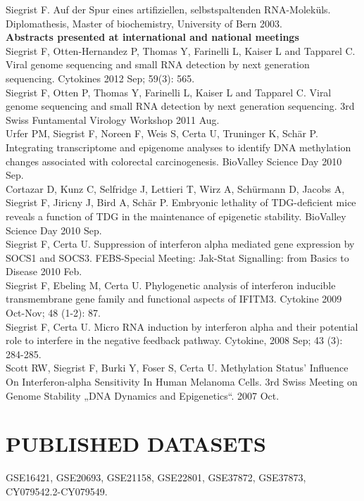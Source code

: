 \documentclass{res}
\begin{document}
\begin{resume}
Siegrist F. Auf der Spur eines artifiziellen, selbstspaltenden RNA-Moleküls. Diplomathesis, Master of biochemistry, University of Bern 2003. \\
   {\bf  Abstracts presented at international and national meetings}  \\
Siegrist F, Otten-Hernandez P, Thomas Y, Farinelli L, Kaiser L and Tapparel C. Viral genome sequencing and small RNA detection by next generation sequencing. Cytokines 2012 Sep; 59(3): 565. \\
Siegrist F, Otten P, Thomas Y, Farinelli L, Kaiser L and Tapparel C. Viral genome sequencing and small RNA detection by next generation sequencing. 3rd Swiss Funtamental Virology Workshop 2011 Aug. \\
Urfer PM, Siegrist F, Noreen F, Weis S, Certa U, Truninger K, Schär P. Integrating transcriptome and epigenome analyses to identify DNA methylation changes associated with colorectal carcinogenesis. BioValley Science Day 2010 Sep. \\
Cortazar D, Kunz C, Selfridge J, Lettieri T, Wirz A, Schürmann D, Jacobs A, Siegrist F, Jiricny J, Bird A, Schär P. Embryonic lethality of TDG-deficient mice reveals a function of TDG in the maintenance of epigenetic stability. BioValley Science Day 2010 Sep. \\
Siegrist F, Certa U. Suppression of interferon alpha mediated gene expression by SOCS1 and SOCS3. FEBS-Special Meeting: Jak-Stat Signalling: from Basics to Disease 2010 Feb. \\
Siegrist F, Ebeling M, Certa U. Phylogenetic analysis of interferon inducible transmembrane gene family and functional aspects of IFITM3. Cytokine 2009 Oct-Nov; 48 (1-2): 87. \\
Siegrist F, Certa U. Micro RNA induction by interferon alpha and their potential role to interfere in the negative feedback pathway. Cytokine, 2008 Sep; 43 (3): 284-285. \\
Scott RW, Siegrist F, Burki Y, Foser S, Certa U. Methylation Status’ Influence On Interferon-alpha Sensitivity In Human Melanoma Cells. 3rd Swiss Meeting on Genome Stability „DNA Dynamics and Epigenetics“. 2007 Oct.

\section{PUBLISHED DATASETS} 
\vspace{0.1in} 
GSE16421, GSE20693, GSE21158, GSE22801, GSE37872, GSE37873, CY079542.2-CY079549.

\end{resume}
\end{document}
